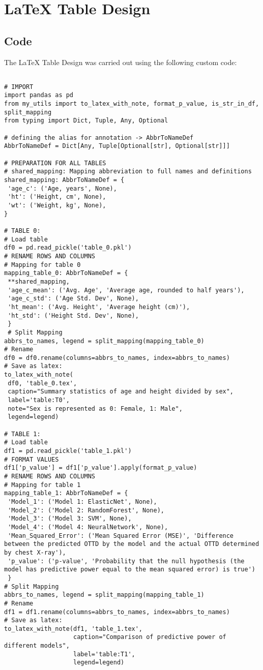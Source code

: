 \documentclass[11pt]{article}
\begin{document}
\section{LaTeX Table Design}
\subsection{{Code}}
The LaTeX Table Design was carried out using the following custom code:

\begin{verbatim}

# IMPORT
import pandas as pd
from my_utils import to_latex_with_note, format_p_value, is_str_in_df, split_mapping
from typing import Dict, Tuple, Any, Optional

# defining the alias for annotation -> AbbrToNameDef
AbbrToNameDef = Dict[Any, Tuple[Optional[str], Optional[str]]]

# PREPARATION FOR ALL TABLES
# shared_mapping: Mapping abbreviation to full names and definitions
shared_mapping: AbbrToNameDef = {
 'age_c': ('Age, years', None),
 'ht': ('Height, cm', None),
 'wt': ('Weight, kg', None), 
}

# TABLE 0:
# Load table
df0 = pd.read_pickle('table_0.pkl')
# RENAME ROWS AND COLUMNS
# Mapping for table 0
mapping_table_0: AbbrToNameDef = {
 **shared_mapping,
 'age_c_mean': ('Avg. Age', 'Average age, rounded to half years'),
 'age_c_std': ('Age Std. Dev', None),
 'ht_mean': ('Avg. Height', 'Average height (cm)'),
 'ht_std': ('Height Std. Dev', None),  
 }
 # Split Mapping
abbrs_to_names, legend = split_mapping(mapping_table_0)
# Rename
df0 = df0.rename(columns=abbrs_to_names, index=abbrs_to_names)
# Save as latex:
to_latex_with_note(
 df0, 'table_0.tex',
 caption="Summary statistics of age and height divided by sex", 
 label='table:T0',
 note="Sex is represented as 0: Female, 1: Male",
 legend=legend)

# TABLE 1:
# Load table
df1 = pd.read_pickle('table_1.pkl')
# FORMAT VALUES
df1['p_value'] = df1['p_value'].apply(format_p_value)
# RENAME ROWS AND COLUMNS
# Mapping for table 1
mapping_table_1: AbbrToNameDef = {
 'Model_1': ('Model 1: ElasticNet', None),
 'Model_2': ('Model 2: RandomForest', None),
 'Model_3': ('Model 3: SVM', None),
 'Model_4': ('Model 4: NeuralNetwork', None),
 'Mean_Squared_Error': ('Mean Squared Error (MSE)', 'Difference between the predicted OTTD by the model and the actual OTTD determined by chest X-ray'),
 'p_value': ('p-value', 'Probability that the null hypothesis (the model has predictive power equal to the mean squared error) is true')
 }
# Split Mapping
abbrs_to_names, legend = split_mapping(mapping_table_1)
# Rename
df1 = df1.rename(columns=abbrs_to_names, index=abbrs_to_names)
# Save as latex:
to_latex_with_note(df1, 'table_1.tex', 
                   caption="Comparison of predictive power of different models", 
                   label='table:T1', 
                   legend=legend)


\end{verbatim}
\end{document}
